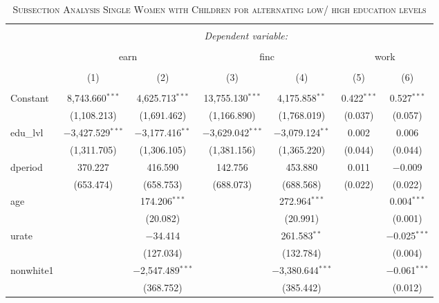 \documentclass[a4paper]{article}
\begin{document}
\begin{table}[!htbp] \centering 
\begin{adjustwidth}{0.cm}{-0cm}
\begin{threeparttable}
\small
\captionsetup{font=small, justification=raggedright,singlelinecheck=false}
\caption{\textsc{Subsection Analysis Single Women with Children for alternating low/ high education levels}}
\centering 
  \label{}
\small 
\begin{tabular}{@{\extracolsep{-2pt}}lcccccc} 
\\[-5.8ex]\hline 
\hline \\[-1.8ex] 
 & \multicolumn{6}{c}{\textit{Dependent variable:}} \\ 
\cline{2-7} 
\\[-1.8ex] & \multicolumn{2}{c}{earn} & \multicolumn{2}{c}{finc} & \multicolumn{2}{c}{work} \\ 
\\[-1.8ex] & (1) & (2) & (3) & (4) & (5) & (6)\\ 
\hline \\[-1.8ex] 
 Constant & 8,743.660$^{***}$ & 4,625.713$^{***}$ & 13,755.130$^{***}$ & 4,175.858$^{**}$ & 0.422$^{***}$ & 0.527$^{***}$ \\ 
  & (1,108.213) & (1,691.462) & (1,166.890) & (1,768.019) & (0.037) & (0.057) \\ 
  edu\_lvl & $-$3,427.529$^{***}$ & $-$3,177.416$^{**}$ & $-$3,629.042$^{***}$ & $-$3,079.124$^{**}$ & 0.002 & 0.006 \\ 
  & (1,311.705) & (1,306.105) & (1,381.156) & (1,365.220) & (0.044) & (0.044) \\ 
  dperiod & 370.227 & 416.590 & 142.756 & 453.880 & 0.011 & $-$0.009 \\ 
  & (653.474) & (658.753) & (688.073) & (688.568) & (0.022) & (0.022) \\ 
  age &  & 174.206$^{***}$ &  & 272.964$^{***}$ &  & 0.004$^{***}$ \\ 
  &  & (20.082) &  & (20.991) &  & (0.001) \\ 
  urate &  & $-$34.414 &  & 261.583$^{**}$ &  & $-$0.025$^{***}$ \\ 
  &  & (127.034) &  & (132.784) &  & (0.004) \\ 
  nonwhite1 &  & $-$2,547.489$^{***}$ &  & $-$3,380.644$^{***}$ &  & $-$0.061$^{***}$ \\ 
  &  & (368.752) &  & (385.442) &  & (0.012) \\ 

\end{tabular}
\end{threeparttable}
\end{adjustwidth}
\end{table}
\end{document}
